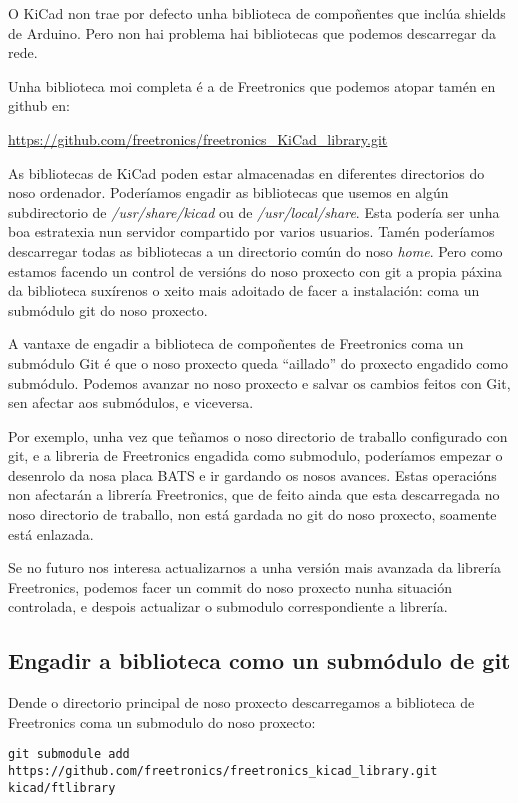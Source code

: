O KiCad non trae por defecto unha biblioteca de compoñentes que inclúa
shields de Arduino. Pero non hai problema hai bibliotecas que podemos
descarregar da rede.

Unha biblioteca moi completa é a de Freetronics que podemos atopar tamén
en github en:

\url{https://github.com/freetronics/freetronics_KiCad_library.git}

As bibliotecas de KiCad poden estar almacenadas en diferentes
directorios do noso ordenador. Poderíamos engadir as bibliotecas que
usemos en algún subdirectorio de \emph{/usr/share/kicad} ou de
\emph{/usr/local/share}. Esta podería ser unha boa estratexia nun
servidor compartido por varios usuarios. Tamén poderíamos descarregar
todas as bibliotecas a un directorio común do noso \emph{home}. Pero
como estamos facendo un control de versións do noso proxecto con git a
propia páxina da biblioteca suxírenos o xeito mais adoitado de facer a
instalación: coma un submódulo git do noso proxecto.

A vantaxe de engadir a biblioteca de compoñentes de Freetronics coma un
submódulo Git é que o noso proxecto queda ``aillado'' do proxecto
engadido como submódulo. Podemos avanzar no noso proxecto e salvar os
cambios feitos con Git, sen afectar aos submódulos, e viceversa.

Por exemplo, unha vez que teñamos o noso directorio de traballo
configurado con git, e a libreria de Freetronics engadida como
submodulo, poderíamos empezar o desenrolo da nosa placa BATS e ir
gardando os nosos avances. Estas operacións non afectarán a librería
Freetronics, que de feito ainda que esta descarregada no noso directorio
de traballo, non está gardada no git do noso proxecto, soamente está
enlazada.

Se no futuro nos interesa actualizarnos a unha versión mais avanzada da
librería Freetronics, podemos facer un commit do noso proxecto nunha
situación controlada, e despois actualizar o submodulo correspondiente a
librería.

\subsection{Engadir a biblioteca como un submódulo de
git}\label{engadir-a-biblioteca-como-un-submuxf3dulo-de-git}

Dende o directorio principal de noso proxecto descarregamos a biblioteca
de Freetronics coma un submodulo do noso proxecto:

\begin{verbatim}
git submodule add https://github.com/freetronics/freetronics_kicad_library.git kicad/ftlibrary
\end{verbatim}

